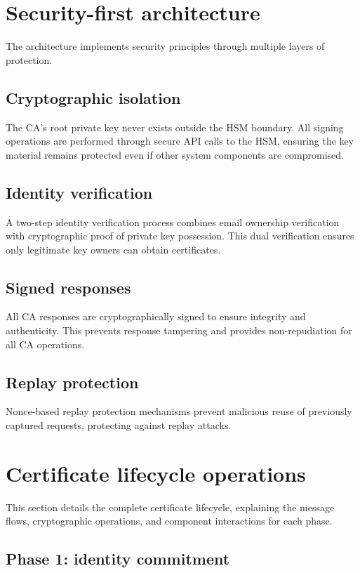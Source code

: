 \section{Security-first architecture}

The architecture implements security principles through multiple 
layers of protection.

\subsection{Cryptographic isolation}
The CA's root private key never exists outside 
the HSM boundary. All signing operations are performed through secure API calls 
to the HSM, ensuring the key material remains protected even if other system 
components are compromised.

\subsection{Identity verification}
A two-step identity verification process combines 
email ownership verification with cryptographic proof of private key possession. 
This dual verification ensures only legitimate key owners can obtain certificates.

\subsection{Signed responses}
All CA responses are cryptographically signed to ensure 
integrity and authenticity. This prevents response tampering and provides 
non-repudiation for all CA operations.

\subsection{Replay protection}
Nonce-based replay protection mechanisms prevent 
malicious reuse of previously captured requests, protecting against replay attacks.

\section{Certificate lifecycle operations}

This section details the complete certificate lifecycle, explaining the message 
flows, cryptographic operations, and component interactions for each phase.

\subsection{Phase 1: identity commitment}

